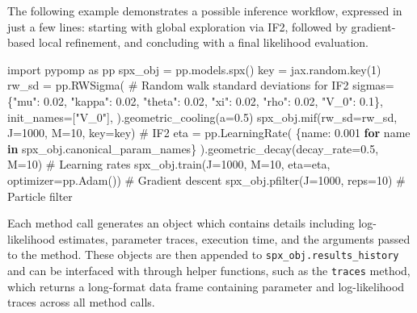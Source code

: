 \documentclass[twoside,11pt]{article}
\newenvironment{Shaded}{\begin{snugshade}}{\end{snugshade}}
\newcommand{\CommentTok}[1]{\textcolor[rgb]{0.37,0.37,0.37}{#1}}
\newcommand{\ControlFlowTok}[1]{\textcolor[rgb]{0.00,0.23,0.31}{\textbf{#1}}}
\newcommand{\DecValTok}[1]{\textcolor[rgb]{0.68,0.00,0.00}{#1}}
\newcommand{\FloatTok}[1]{\textcolor[rgb]{0.68,0.00,0.00}{#1}}
\newcommand{\ImportTok}[1]{\textcolor[rgb]{0.00,0.46,0.62}{#1}}
\newcommand{\KeywordTok}[1]{\textcolor[rgb]{0.00,0.23,0.31}{\textbf{#1}}}
\newcommand{\NormalTok}[1]{\textcolor[rgb]{0.00,0.23,0.31}{#1}}
\newcommand{\OperatorTok}[1]{\textcolor[rgb]{0.37,0.37,0.37}{#1}}
\newcommand{\StringTok}[1]{\textcolor[rgb]{0.13,0.47,0.30}{#1}}
\begin{document}
The following example demonstrates a possible inference workflow,
expressed in just a few lines: starting with global exploration via IF2,
followed by gradient-based local refinement, and concluding with a final
likelihood evaluation.

\label{spx-inference-workflow}
\begin{Shaded}
\begin{Highlighting}[]
\ImportTok{import}\NormalTok{ pypomp }\ImportTok{as}\NormalTok{ pp}
\NormalTok{spx\_obj }\OperatorTok{=}\NormalTok{ pp.models.spx()}
\NormalTok{key }\OperatorTok{=}\NormalTok{ jax.random.key(}\DecValTok{1}\NormalTok{)}
\NormalTok{rw\_sd }\OperatorTok{=}\NormalTok{ pp.RWSigma( }\CommentTok{\# Random walk standard deviations for IF2}
\NormalTok{    sigmas}\OperatorTok{=}\NormalTok{\{}\StringTok{"mu"}\NormalTok{: }\FloatTok{0.02}\NormalTok{, }\StringTok{"kappa"}\NormalTok{: }\FloatTok{0.02}\NormalTok{, }\StringTok{"theta"}\NormalTok{: }\FloatTok{0.02}\NormalTok{, }
            \StringTok{"xi"}\NormalTok{: }\FloatTok{0.02}\NormalTok{, }\StringTok{"rho"}\NormalTok{: }\FloatTok{0.02}\NormalTok{, }\StringTok{"V\_0"}\NormalTok{: }\FloatTok{0.1}\NormalTok{\},}
\NormalTok{    init\_names}\OperatorTok{=}\NormalTok{[}\StringTok{"V\_0"}\NormalTok{],}
\NormalTok{).geometric\_cooling(a}\OperatorTok{=}\FloatTok{0.5}\NormalTok{)}
\NormalTok{spx\_obj.mif(rw\_sd}\OperatorTok{=}\NormalTok{rw\_sd, J}\OperatorTok{=}\DecValTok{1000}\NormalTok{, M}\OperatorTok{=}\DecValTok{10}\NormalTok{, key}\OperatorTok{=}\NormalTok{key) }\CommentTok{\# IF2}
\NormalTok{eta }\OperatorTok{=}\NormalTok{ pp.LearningRate(}
\NormalTok{  \{name: }\FloatTok{0.001} \ControlFlowTok{for}\NormalTok{ name }\KeywordTok{in}\NormalTok{ spx\_obj.canonical\_param\_names\}}
\NormalTok{).geometric\_decay(decay\_rate}\OperatorTok{=}\FloatTok{0.5}\NormalTok{, M}\OperatorTok{=}\DecValTok{10}\NormalTok{) }\CommentTok{\# Learning rates}
\NormalTok{spx\_obj.train(J}\OperatorTok{=}\DecValTok{1000}\NormalTok{, M}\OperatorTok{=}\DecValTok{10}\NormalTok{, eta}\OperatorTok{=}\NormalTok{eta, optimizer}\OperatorTok{=}\NormalTok{pp.Adam()) }\CommentTok{\# Gradient descent}
\NormalTok{spx\_obj.pfilter(J}\OperatorTok{=}\DecValTok{1000}\NormalTok{, reps}\OperatorTok{=}\DecValTok{10}\NormalTok{) }\CommentTok{\# Particle filter}
\end{Highlighting}
\end{Shaded}

Each method call generates an object which contains details including
log-likelihood estimates, parameter traces, execution time, and the
arguments passed to the method. These objects are then appended to
\texttt{spx\_obj.results\_history} and can be interfaced with through
helper functions, such as the \texttt{traces} method, which returns a
long-format data frame containing parameter and log-likelihood traces
across all method calls.
\end{document}
